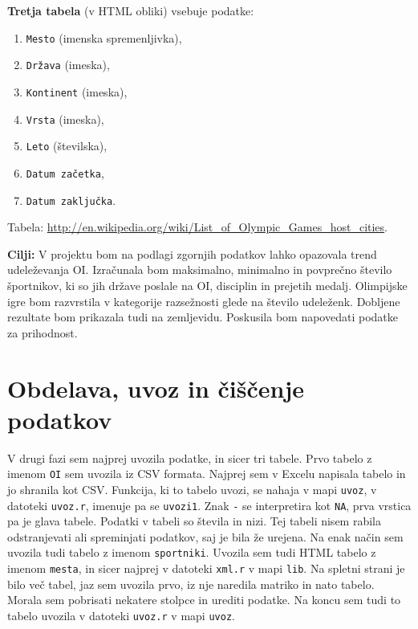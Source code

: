 \documentclass[11pt,a4paper]{article}
\begin{document}
\textbf{Tretja tabela} (v HTML obliki) vsebuje podatke: 
\begin{enumerate}
\item{\verb|Mesto| (imenska spremenljivka),}
\item{\verb|Država| (imeska),}
\item{\verb|Kontinent| (imeska),}
\item{\verb|Vrsta| (imeska),}
\item{\verb|Leto| (številska),}
\item{\verb|Datum začetka|,}
\item{\verb|Datum zaključka|.}

\end{enumerate}
 Tabela:
\url{http://en.wikipedia.org/wiki/List_of_Olympic_Games_host_cities}.
\newline

\textbf{Cilji:} V projektu bom na podlagi zgornjih podatkov lahko opazovala trend udeleževanja OI. 
Izračunala bom maksimalno, minimalno in povprečno število športnikov, ki so jih države poslale na OI, disciplin in prejetih medalj. 
Olimpijske igre bom razvrstila v kategorije razsežnosti glede na število udeleženk. Dobljene rezultate bom prikazala tudi 
na zemljevidu. Poskusila bom napovedati podatke za prihodnost.

\newpage
\section{Obdelava, uvoz in čiščenje podatkov}
V drugi fazi sem najprej uvozila podatke, in sicer tri tabele. Prvo tabelo z imenom \verb|OI| sem uvozila iz CSV formata. Najprej sem v Excelu napisala tabelo in jo shranila kot CSV. Funkcija, ki to tabelo uvozi, se nahaja v mapi \verb|uvoz|, v datoteki \verb|uvoz.r|, imenuje pa se \verb|uvozi1|. Znak \verb|-| se interpretira kot \verb|NA|, prva vrstica pa je glava tabele. Podatki v tabeli so števila in nizi. Tej tabeli nisem rabila odstranjevati  ali spreminjati podatkov, saj je bila že urejena.
\newline
Na enak način sem uvozila tudi tabelo z imenom \verb|sportniki|.
\newline
Uvozila sem tudi HTML tabelo z imenom \verb|mesta|, in sicer najprej v datoteki \verb|xml.r| v mapi \verb|lib|. Na spletni strani je bilo več tabel, jaz sem uvozila prvo, iz nje naredila matriko in nato tabelo. Morala sem pobrisati nekatere stolpce in urediti podatke. Na koncu sem tudi to tabelo uvozila v datoteki \verb|uvoz.r| v mapi \verb|uvoz|.
\newline
\end{document}

